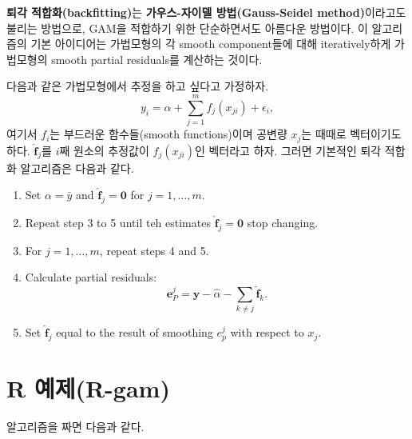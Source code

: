 \documentclass[b5paper,]{book}
\makeatletter
\newenvironment{Shaded}{\begin{snugshade}}{\end{snugshade}}
\newcommand{\KeywordTok}[1]{\textcolor[rgb]{0.13,0.29,0.53}{\textbf{{#1}}}}
\newcommand{\DataTypeTok}[1]{\textcolor[rgb]{0.13,0.29,0.53}{{#1}}}
\newcommand{\DecValTok}[1]{\textcolor[rgb]{0.00,0.00,0.81}{{#1}}}
\newcommand{\FloatTok}[1]{\textcolor[rgb]{0.00,0.00,0.81}{{#1}}}
\newcommand{\StringTok}[1]{\textcolor[rgb]{0.31,0.60,0.02}{{#1}}}
\newcommand{\CommentTok}[1]{\textcolor[rgb]{0.56,0.35,0.01}{\textit{{#1}}}}
\newcommand{\OtherTok}[1]{\textcolor[rgb]{0.56,0.35,0.01}{{#1}}}
\newcommand{\NormalTok}[1]{{#1}}
\newenvironment{kframe}{%
\medskip{}
\setlength{\fboxsep}{.8em}
 \def\at@end@of@kframe{}%
 \ifinner\ifhmode%
  \def\at@end@of@kframe{\end{minipage}}%
  \begin{minipage}{\columnwidth}%
 \fi\fi%
 \def\FrameCommand##1{\hskip\@totalleftmargin \hskip-\fboxsep
 \colorbox{shadecolor}{##1}\hskip-\fboxsep
     \hskip-\linewidth \hskip-\@totalleftmargin \hskip\columnwidth}%
 \MakeFramed {\advance\hsize-\width
   \@totalleftmargin\z@ \linewidth\hsize
   \@setminipage}}%
 {\par\unskip\endMakeFramed%
 \at@end@of@kframe}
\renewenvironment{Shaded}{\begin{kframe}}{\end{kframe}}
\theoremstyle{definition}
\theoremstyle{definition}
\theoremstyle{definition}
\theoremstyle{remark}
\makeatother
\begin{document}
\textbf{퇴각 적합화(backfitting)}는 \textbf{가우스-자이델
방법(Gauss-Seidel method)}이라고도 불리는 방법으로, GAM을 적합하기 위한
단순하면서도 아름다운 방법이다. 이 알고리즘의 기본 아이디어는 가법모형의
각 smooth component들에 대해 iteratively하게 가법모형의 smooth partial
residuals를 계산하는 것이다.

다음과 같은 가법모형에서 추정을 하고 싶다고 가정하자.
\[y_{i}=\alpha + \sum_{j=1}^{m}f_{j}(x_{ji})+\epsilon_{i},\] 여기서
\(f_{i}\)는 부드러운 함수들(smooth functions)이며 공변량 \(x_{j}\)는
때때로 벡터이기도 하다. \(\hat{\mathbf{f}}_{j}\)를 \(i\)째 원소의
추정값이 \(f_{j}(x_{ji})\)인 벡터라고 하자. 그러면 기본적인 퇴각 적합화
알고리즘은 다음과 같다.

\begin{enumerate}
\def\labelenumi{\arabic{enumi}.}
\item
  Set \(\alpha=\bar{y}\) and \(\hat{\mathbf{f}}_{j}=\mathbf{0}\) for
  \(j=1,\ldots , m\).
\item
  Repeat step 3 to 5 until teh estimates
  \(\hat{\mathbf{f}}_{j}=\mathbf{0}\) stop changing.
\item
  For \(j=1,\ldots ,m\), repeat steps 4 and 5.
\item
  Calculate partial residuals:
  \[\mathbf{e}_{P}^{j}=\mathbf{y}-\hat{\alpha}-\sum_{k\neq j}\hat{\mathbf{f}}_{k}.\]
\item
  Set \(\hat{\mathbf{f}}_{j}\) equal to the result of smoothing
  \(e_{p}^{j}\) with respect to \(x_{j}\).
\end{enumerate}

\section{R 예제(R-gam)}\label{r-r-gam}

알고리즘을 짜면 다음과 같다.

\begin{Shaded}
\end{Shaded}
\end{document}
